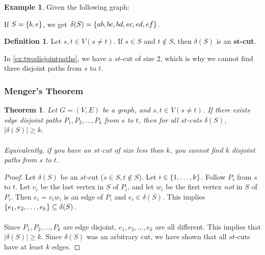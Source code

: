 \documentclass[]{article}
\newtheorem*{theorem}{Theorem}
\theoremstyle{definition}
\newtheorem*{defn}{Definition}
\newtheorem{ex}{Example}[section]
\DeclarePairedDelimiter{\set}{\lbrace}{\rbrace}
\begin{document}
			\begin{ex}
				Given the following graph:
				\begin{center}
				\end{center}
				
				If $S = \set{b, e}$, we get $\delta(S) = \set{ab, bc, bd, ec, ed, ef}$.
			\end{ex}

			\begin{defn}
				Let $s, t \in V (s \ne t)$. If $s \in S$ and $t \not \in S$, then $\delta(S)$ is an \textbf{$\mathbf{st}$-cut}.
			\end{defn}
			
			In \ref{ex:twodisjointpaths}, we have a $st$-cut of size 2, which is why we cannot find three disjoint paths from $s$ to $t$.

			\subsubsection{Menger's Theorem}
				\begin{theorem}
					Let $G = (V, E)$ be a graph, and $s, t \in V (s \ne t)$. If there exists edge disjoint paths $P_1, P_2, \ldots, P_k$ from $s$ to $t$, then for all $st$-cuts $\delta(S)$, $|\delta(S)| \ge k$.
					\\ \\
					Equivalently, if you have an $st$-cut of size less than $k$, you cannot find $k$ disjoint paths from $s$ to $t$.
				\end{theorem}
			
				\begin{proof}
					Let $\delta(S)$ be an $st$-cut ($s \in S, t \not \in S$). Let $i \in \set{1, \ldots, k}$. Follow $P_i$ from $s$ to $t$. Let $v_i$ be the last vertex in $S$ of $P_i$, and let $w_i$ be the first vertex \emph{not} in $S$ of $P_i$. Then $e_i = v_i w_i$ is an edge of $P_i$ and $e_i \in \delta(S)$. This implies $\set{e_1, e_2, \ldots, e_k} \subseteq \delta(S)$.
					\\ \\
					Since $P_1, P_2, \ldots, P_k$ are edge disjoint, $e_1, e_2, \ldots, e_k$ are all different. This implies that $|\delta(S)| \ge k$. Since $\delta(S)$ was an arbitrary cut, we have shown that all $st$-cuts have at least $k$ edges.
				\end{proof}
			
\end{document}
